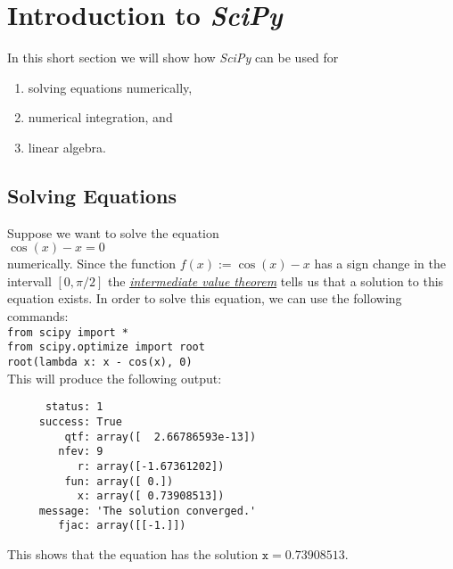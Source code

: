 \documentclass{report}
\begin{document}
\chapter{Introduction to \textsl{SciPy}}
In this short section we will show how \textsl{SciPy} can be used for
\begin{enumerate}
\item solving equations numerically, 
\item numerical integration, and
\item linear algebra.
\end{enumerate}

\section{Solving Equations}
Suppose we want to solve the equation
\\[0.2cm]
\hspace*{1.3cm}
$\cos(x) - x = 0$
\\[0.2cm]
numerically.  Since the function $f(x) := \cos(x) - x$ has a sign change in the intervall $[0,\pi/2]$ the 
\href{http://en.wikipedia.org/wiki/Intermediate_value_theorem}{\emph{intermediate value theorem}}
tells us that a solution to this equation exists.  In order to solve this equation, we can use the
following commands:
\\[0.2cm]
\hspace*{1.3cm}
\texttt{from scipy import *} \\
\hspace*{1.3cm}
\texttt{from scipy.optimize import root} \\
\hspace*{1.3cm}
\texttt{root(lambda x: x - cos(x), 0)}
\\[0.2cm]
This will produce the following output:
\begin{verbatim}
      status: 1
     success: True
         qtf: array([  2.66786593e-13])
        nfev: 9
           r: array([-1.67361202])
         fun: array([ 0.])
           x: array([ 0.73908513])
     message: 'The solution converged.'
        fjac: array([[-1.]])
\end{verbatim}
This shows that the equation has the solution $\mathtt{x} = 0.73908513$.
\end{document}
